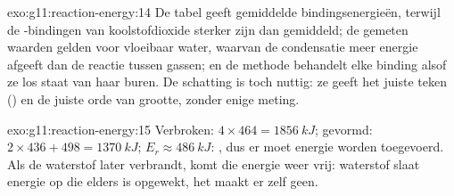 \begin{solution}{exo:g11:reaction-energy:14}
De tabel geeft gemiddelde bindingsenergieën, terwijl de
-bindingen van koolstofdioxide sterker zijn dan gemiddeld; de
gemeten waarden gelden voor vloeibaar water, waarvan de condensatie meer
energie afgeeft dan de reactie tussen gassen; en de methode behandelt
elke binding alsof ze los staat van haar buren. De schatting is toch
nuttig: ze geeft het juiste teken () en de juiste orde van
grootte, zonder enige meting.
\end{solution}

\begin{solution}{exo:g11:reaction-energy:15}
Verbroken: $4 \times 464 = \qty{1856}{kJ}$; gevormd: $2 \times 436 + 498 =
\qty{1370}{kJ}$; $E_r \approx \qty{+486}{kJ}$: , dus er moet
energie worden toegevoerd. Als de waterstof later verbrandt, komt die
energie weer vrij: waterstof slaat energie op die elders is opgewekt, het
maakt er zelf geen.
\end{solution}

